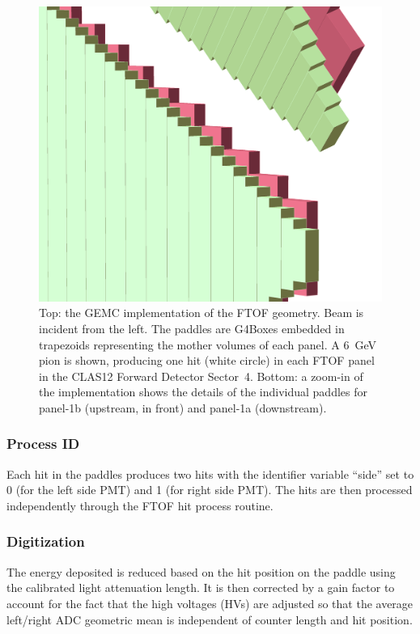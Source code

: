 \begin{figure}
	\includegraphics[width=0.99\columnwidth,keepaspectratio]{img/ftofDetail.png}
	\caption{Top: the GEMC implementation of the FTOF geometry. Beam is incident from the left. The paddles are
          G4Boxes embedded in trapezoids representing the mother volumes of each panel. A 6~GeV pion is shown,
          producing one hit (white circle) in each FTOF panel in the CLAS12 Forward Detector Sector~4. Bottom: a zoom-in
          of the implementation shows the details of the individual paddles for panel-1b (upstream, in front) and panel-1a
          (downstream).}
	\label{fig:ftofGeometry}
\end{figure}

\subsubsection{Process ID}

Each hit in the paddles produces two hits with the identifier variable ``side'' set to 0 (for the left side PMT) and 1
(for right side PMT). The hits are then processed independently through the FTOF hit process routine.

\subsubsection{Digitization}

The energy deposited is reduced based on the hit position on the paddle using the calibrated light attenuation length.
It is then corrected by a gain factor to account for the fact that the high voltages (HVs) are adjusted so that
the average left/right ADC geometric mean is independent of counter length and hit position.


